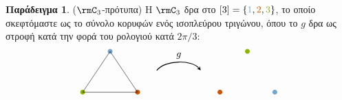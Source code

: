\documentclass[12pt,a4paper,reqno]{amsart}
\theoremstyle{definition}
\newtheorem*{example}{Παράδειγμα}
\newcommand{\one}{\textcolor{iceberg}{1}}
\newcommand{\two}{\textcolor{burntorange}{2}}
\newcommand{\three}{\textcolor{applegreen}{3}}
\begin{document}
\begin{example}{\rm($\rmC_3$-πρότυπα)}
    Η $\rmC_3$ δρα στο $[3]=\{\one, \two, \three\}$, το οποίο σκεφτόμαστε ως το σύνολο κορυφών ενός ισοπλεύρου τριγώνου, όπου το $g$ δρα ως στροφή κατά την φορά του ρολογιού κατά $2\pi/3$:
    \[
    \begin{tikzpicture}[>=stealth]
        \tikzstyle{point}=[circle,fill,inner sep=0pt, minimum width=5pt, minimum height=5pt]
        \begin{scope}[shift={(-1,-.5)}]
            \node[iceberg] (e3)[point] at (1,1.5) {};
            \node[burntorange] (e1)[point] at (2,0) {};
            \node[applegreen] (e2)[point] at (0,0) {};

            \coordinate (bary) at (1,0.5) {}; 

            \draw (e1.center) -- (e2.center) -- (e3.center) -- cycle;
        \end{scope}
    \draw[->, thick]
    (1.7,0.3) .. controls (2,0.7) and (3,0.7) .. (3.3,0.3)
    node[midway, above] {$g$};

        \begin{scope}[shift={(4,-.5)}]
            \node[applegreen] (e3)[point] at (1,1.5) {};
            \node[iceberg] (e1)[point] at (2,0) {};
            \node[burntorange] (e2)[point] at (0,0) {};

            \coordinate (bary) at (1,0.5) {}; 


\end{scope}
\end{tikzpicture}\]
\end{example}
\end{document}
